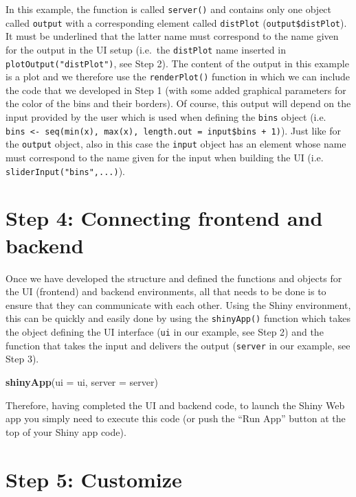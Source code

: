 \documentclass[12pt,]{krantz}
\newenvironment{Shaded}{\begin{snugshade}}{\end{snugshade}}
\newcommand{\KeywordTok}[1]{\textcolor[rgb]{0.27,0.27,0.27}{\textbf{#1}}}
\newcommand{\DataTypeTok}[1]{\textcolor[rgb]{0.27,0.27,0.27}{#1}}
\newcommand{\NormalTok}[1]{#1}
\begin{document}
In this example, the function is called \texttt{server()} and contains
only one object called \texttt{output} with a corresponding element
called \texttt{distPlot} (\texttt{output\$distPlot}). It must be
underlined that the latter name must correspond to the name given for
the output in the UI setup (i.e.~the \texttt{distPlot} name inserted in
\texttt{plotOutput("distPlot")}, see Step 2). The content of the output
in this example is a plot and we therefore use the \texttt{renderPlot()}
function in which we can include the code that we developed in Step 1
(with some added graphical parameters for the color of the bins and
their borders). Of course, this output will depend on the input provided
by the user which is used when defining the \texttt{bins} object (i.e.
\texttt{bins\ \textless{}-\ seq(min(x),\ max(x),\ length.out\ =\ input\$bins\ +\ 1)}).
Just like for the \texttt{output} object, also in this case the
\texttt{input} object has an element whose name must correspond to the
name given for the input when building the UI (i.e.
\texttt{sliderInput("bins",...)}).

\section{Step 4: Connecting frontend and
backend}\label{step-4-connecting-frontend-and-backend}

Once we have developed the structure and defined the functions and
objects for the UI (frontend) and backend environments, all that needs
to be done is to ensure that they can communicate with each other. Using
the Shiny environment, this can be quickly and easily done by using the
\texttt{shinyApp()} function which takes the object defining the UI
interface (\texttt{ui} in our example, see Step 2) and the function that
takes the input and delivers the output (\texttt{server} in our example,
see Step 3).

\begin{Shaded}
\begin{Highlighting}[]
\KeywordTok{shinyApp}\NormalTok{(}\DataTypeTok{ui =}\NormalTok{ ui, }\DataTypeTok{server =}\NormalTok{ server)}
\end{Highlighting}
\end{Shaded}

Therefore, having completed the UI and backend code, to launch the Shiny
Web app you simply need to execute this code (or push the ``Run App''
button at the top of your Shiny app code).

\section{Step 5: Customize}\label{step-5-customize}
\end{document}
